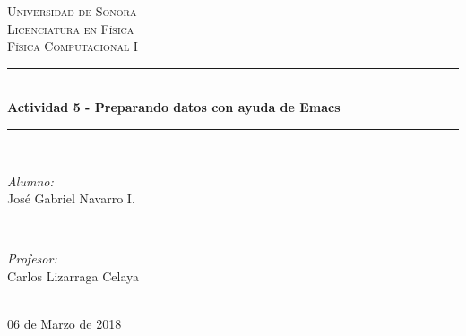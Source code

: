 \documentclass[12pt]{article}
\begin{document}
\begin{titlepage}

\newcommand{\HRule}{\rule{\linewidth}{0.5mm}} %

\center 

\textsc{\LARGE Universidad de Sonora}\\[1.5cm]
\textsc{\Large Licenciatura en Física}\\[0.5cm]
\textsc{\large Física Computacional I}\\[0.5cm]


\HRule \\[0.4cm]
{\huge \bfseries Actividad 5 - Preparando datos con ayuda de Emacs}\\[0.4cm] %
\HRule \\[1.5cm]
 

\begin{minipage}{0.4\textwidth}
\begin{flushleft} \large
\emph{Alumno:}\\
José Gabriel Navarro I.
\end{flushleft}
\end{minipage}
~
\begin{minipage}{0.4\textwidth}
\begin{flushright} \large
\emph{Profesor:} \\
Carlos Lizarraga Celaya
\end{flushright}
\end{minipage}\\[2cm]


06 de Marzo de 2018



\end{titlepage}
\end{document}
